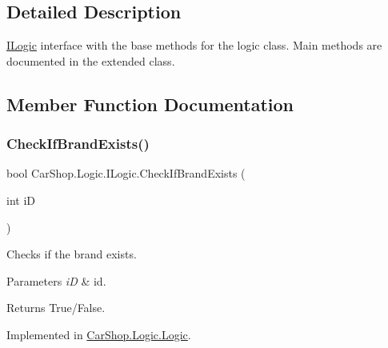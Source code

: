 \subsection{Detailed Description}
\mbox{\hyperlink{interface_car_shop_1_1_logic_1_1_i_logic}{I\+Logic}} interface with the base methods for the logic class. Main methods are documented in the extended class. 



\subsection{Member Function Documentation}
\mbox{\label{interface_car_shop_1_1_logic_1_1_i_logic_a5871000bbf6724abebf701f30113e488}} 
\subsubsection{\texorpdfstring{Check\+If\+Brand\+Exists()}{CheckIfBrandExists()}}
{\footnotesize\ttfamily bool Car\+Shop.\+Logic.\+I\+Logic.\+Check\+If\+Brand\+Exists (\begin{DoxyParamCaption}\item[{int}]{iD }\end{DoxyParamCaption})}



Checks if the brand exists. 


\begin{DoxyParams}{Parameters}
{\em iD} & id.\\
\hline
\end{DoxyParams}
\begin{DoxyReturn}{Returns}
True/\+False.
\end{DoxyReturn}


Implemented in \mbox{\hyperlink{class_car_shop_1_1_logic_1_1_logic_a6f7a2a96646053b01067455ed0b8d0a5}{Car\+Shop.\+Logic.\+Logic}}.

\mbox{\label{interface_car_shop_1_1_logic_1_1_i_logic_ab82e00aae902a6d7417b586487568d93}} 
